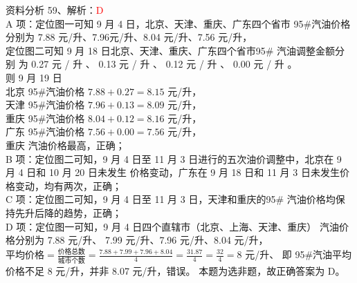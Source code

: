 \documentclass[aspectratio=169]{beamer}
\begin{document}
\begin{frame}[t]{资料分析}
    59、解析：\textcolor{red}{D}\\
    {\scriptsize
    A 项：定位图一可知 9 月 4 日，北京、天津、重庆、广东四个省市 95\#汽油价格分别为 7.88 元/升、7.96元/升、8.04 元/升、7.56 元/升，\\
    定位图二可知 9 月 18 日北京、天津、重庆、广东四个省市95\# 汽油调整金额分 别 为 0.27 元 / 升 、 0.13 元 / 升 、 0.12 元 / 升 、 0.00 元 / 升 。 \\
    则 9 月 19 日\\
    北京 95\#汽油价格 $7.88+0.27=8.15$ 元/升，\\
    天津 95\#汽油价格 $7.96+0.13=8.09$ 元/升，\\
    重庆 95\#汽油价格 $8.04+0.12=8.16$ 元/升，\\
    广东 95\#汽油价格 $7.56+0.00=7.56$ 元/升，\\
    重庆 汽油价格最高，正确；\\
    B 项：定位图二可知，9 月 4 日至 11 月 3 日进行的五次油价调整中，北京在 9 月 4 日和 10 月 20 日未发生
    价格变动，广东在 9 月 18 日和 11 月 3 日未发生价格变动，均有两次，正确；\\
    C 项：定位图二可知，9 月 4 日至 11 月 3 日，天津和重庆的95\# 汽油价格均保持先升后降的趋势，正确；\\
    D 项：定位图一可知，9 月 4 日四个直辖市（北京、上海、天津、重庆） 汽油价格分别为 7.88 元/升、
    7.99 元/升、7.96 元/升、8.04 元/升， $\text{平均价格} = \frac{\text{价格总数}}{\text{城市个数}}  =  \frac{7.88 + 7.99 + 7.96 + 8.04}{4} = \frac{31.87}{4}= \frac{32}{4}  = 8$  元/升、
    即 95\#汽油平均价格不足 8 元/升，并非 8.07 元/升，错误。
    本题为选非题，故正确答案为 D。
    }
\end{frame}                           
\end{document}
